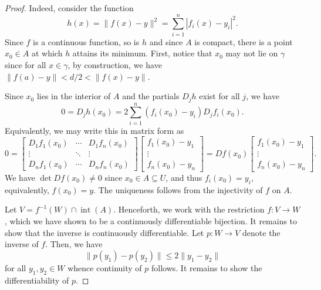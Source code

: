 \begin{proof}
    Indeed, consider the function
    \begin{equation*}
        h(x) = \|f(x) - y\|^2 = \sum_{i = 1}^n |f_i(x) - y_i|^2.
    \end{equation*}
    Since $f$ is a continuous function, so is $h$ and since $A$ is compact, there is a point $x_0\in A$ at which $h$ attains its minimum. First, notice that $x_0$ may not lie on $\gamma$ since for all $x\in\gamma$, by construction, we have $\|f(a) - y\| < d/2 < \|f(x) - y\|$. 

    Since $x_0$ lies in the interior of $A$ and the partials $D_jh$ exist for all $j$, we have 
    \begin{equation*}
        0 = D_jh(x_0) = 2\sum_{i = 1}^n(f_i(x_0) - y_i)D_jf_i(x_0).
    \end{equation*}
    Equivalently, we may write this in matrix form as 
    \begin{equation*}
        0 = 
        \begin{bmatrix}
            D_1f_1(x_0) & \cdots & D_1f_n(x_0)\\
            \vdots & \ddots & \vdots\\
            D_nf_1(x_0) & \cdots & D_nf_n(x_0)
        \end{bmatrix}
        \begin{bmatrix}
            f_1(x_0) - y_1\\
            \vdots\\
            f_n(x_0) - y_n
        \end{bmatrix} 
        = 
        Df(x_0)
        \begin{bmatrix}
            f_1(x_0) - y_1\\
            \vdots\\
            f_n(x_0) - y_n
        \end{bmatrix} 
        .
    \end{equation*}
    We have $\det Df(x_0)\ne 0$ since $x_0\in A\subseteq U$, and thus $f_i(x_0) = y_i$, equivalently, $f(x_0) = y$. The uniqueness follows from the injectivity of $f$ on $A$.

    Let $V = f^{-1}(W)\cap\operatorname{int}(A)$. Henceforth, we work with the restriction $f: V\to W$, which we have shown to be a continuously differentiable bijection. It remains to show that the inverse is continuously differentiable. Let $p: W\to V$ denote the inverse of $f$. Then, we have 
    \begin{equation*}
        \|p(y_1)-p(y_2)\|\le 2\|y_1 - y_2\|
    \end{equation*}
    for all $y_1,y_2\in W$ whence continuity of $p$ follows. It remains to show the differentiability of $p$. 
\end{proof}

